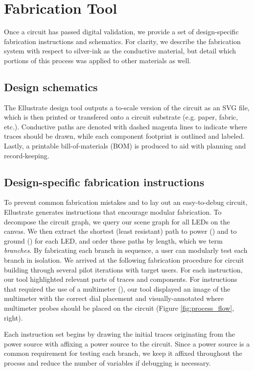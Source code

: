 \documentclass{sigchi}
\begin{document}
\section{Fabrication Tool}
    Once a circuit has passed digital validation, we provide a set of design-specific fabrication instructions and schematics. For clarity, we describe the fabrication system with respect to silver-ink as the conductive material, but detail which portions of this process was applied to other materials as well. 

    \subsection{Design schematics}
        The Ellustrate design tool outputs a to-scale version of the circuit as an SVG file, which is then printed or transfered onto a circuit substrate (e.g. paper, fabric, etc.). Conductive paths are denoted with dashed magenta lines to indicate where traces should be drawn, while each component footprint is outlined and labeled. Lastly, a printable bill-of-materials (BOM) is produced to aid with planning and record-keeping.
    \subsection{Design-specific fabrication instructions}
        To prevent common fabrication mistakes and to lay out an easy-to-debug circuit, Ellustrate generates instructions that encourage modular fabrication. To decompose the circuit graph, we query our scene graph for all LEDs on the canvas. We then extract the shortest (least resistant) path to power () and to ground () for each LED, and order these paths by length, which we term \textit{branches}. By fabricating each branch in sequence, a user can modularly test each branch in isolation. We arrived at the following fabrication procedure for circuit building through several pilot iterations with target users. For each instruction, our tool highlighted relevant parts of traces and components. For instructions that required the use of a multimeter (), our tool displayed an image of the multimeter with the correct dial placement and visually-annotated where multimeter probes should be placed on the circuit (Figure \ref{fig:process_flow}, right). 

        Each instruction set begins by drawing the initial traces originating from the power source with affixing a power source to the circuit. Since a power source is a common requirement for testing each branch, we keep it affixed throughout the procsss and reduce the number of variables if debugging is necessary.
        
\end{document}
